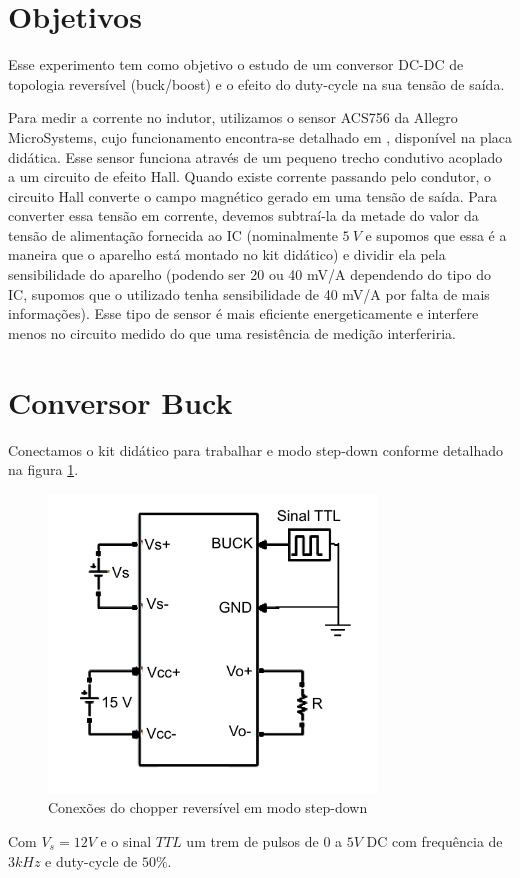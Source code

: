 \documentclass{article}
\begin{document}


\onehalfspacing
\section{Objetivos}
	Esse experimento tem como objetivo o estudo de um conversor DC-DC de topologia reversível (buck/boost) e o efeito do duty-cycle na sua tensão de saída.

	Para medir a corrente no indutor, utilizamos o sensor ACS756 da Allegro MicroSystems, cujo funcionamento encontra-se detalhado em \cite{bb:allegro}, disponível na placa didática. Esse sensor funciona através de um pequeno trecho condutivo acoplado a um circuito de efeito Hall. Quando existe corrente passando pelo condutor, o circuito Hall converte o campo magnético gerado em uma tensão de saída. Para converter essa tensão em corrente, devemos subtraí-la da metade do valor da tensão de alimentação fornecida ao IC (nominalmente $5\ V$ e supomos que essa é a maneira que o aparelho está montado no kit didático) e dividir ela pela sensibilidade do aparelho (podendo ser 20 ou 40 mV/A dependendo do tipo do IC, supomos que o utilizado tenha sensibilidade de 40 mV/A por falta de mais informações). Esse tipo de sensor é mais eficiente energeticamente e interfere menos no circuito medido do que uma resistência de medição interferiria.
\section{Conversor Buck}
Conectamos o kit didático para trabalhar e modo step-down conforme detalhado na figura \ref{fig:buesq}.
\begin{figure}[H]
	\centering
	\includegraphics[width=0.5\linewidth]{Dados/buck/esq}
	\caption{Conexões do chopper reversível em modo step-down \cite{bb:paiva}}
	\label{fig:buesq}
\end{figure}
Com $V_s = 12V$ e o sinal $TTL$ um trem de pulsos de $0$ a $5V$ DC com frequência de $3kHz$ e duty-cycle de $50\%$.
\end{document}
